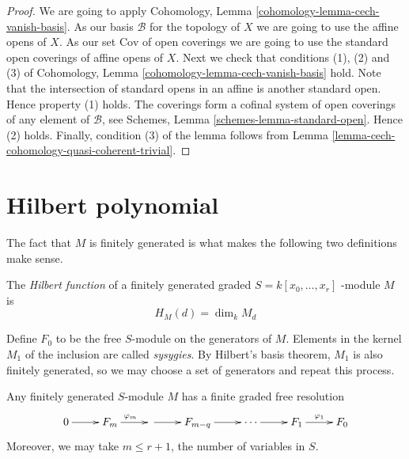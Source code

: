 \begin{proof}
We are going to apply
Cohomology, Lemma \ref{cohomology-lemma-cech-vanish-basis}.
As our basis $\mathcal{B}$ for the topology of $X$ we are going to use
the affine opens of $X$.
As our set $\text{Cov}$ of open coverings we are going to use the standard
open coverings of affine opens of $X$.
Next we check that conditions (1), (2) and (3) of
Cohomology, Lemma \ref{cohomology-lemma-cech-vanish-basis}
hold. Note that the intersection of standard opens in an affine is
another standard open. Hence property (1) holds.
The coverings form a cofinal system of open coverings of any element
of $\mathcal{B}$, see
Schemes, Lemma \ref{schemes-lemma-standard-open}.
Hence (2) holds.
Finally, condition (3) of the lemma follows from
Lemma \ref{lemma-cech-cohomology-quasi-coherent-trivial}.
\end{proof}

\section{Hilbert polynomial}
\label{section-Hilbert-polynomial}

The fact that $M$ is finitely generated is what makes the following two
definitions make sense.

\begin{definition}
\label{definition-Hilbert-function}
The {\it Hilbert function} of a finitely generated graded $S=k[x_0,\ldots,x_r]$ 
-module $M$ is
$$
H_M(d)=\dim_kM_d
$$
\end{definition}

\begin{definition}
\label{definition-sysygy}
Define $F_0$ to be the free $S$-module on the generators of $M$. Elements in the
 kernel $M_1$ of the inclusion are called {\it sysygies}. By Hilbert's basis
theorem, $M_1$ is also finitely generated, so we may choose a set of generators
and repeat this process.
\end{definition}

\begin{theorem}
\label{theorem-Hilbert-syzygy}
\begin{reference}
\cite[Theorem 1.1]{sys}
\end{reference}
Any finitely generated $S$-module $M$ has a finite graded free resolution
$$
\xymatrix{
0\ar[r]&F_m\ar[r]^{\varphi_m}&\ar[r]&F_{m-q}\ar[r]&\cdots\ar[r]&
F_1\ar[r]^{\varphi_1}&F_0
}
$$
Moreover, we may take $m\leq r+1$, the number of variables in $S$.
\end{theorem}

